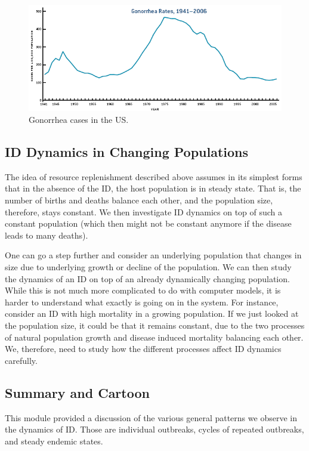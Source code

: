 \documentclass[]{article}
\theoremstyle{definition}
\theoremstyle{definition}
\theoremstyle{definition}
\theoremstyle{remark}
\begin{document}
\begin{figure}
\centering
\includegraphics{./images/gonorrhea.gif}
\caption{\label{fig:gonorrheapattern}Gonorrhea cases in the US.}
\end{figure}

\subsection{ID Dynamics in Changing
Populations}\label{id-dynamics-in-changing-populations}

The idea of resource replenishment described above assumes in its
simplest forms that in the absence of the ID, the host population is in
steady state. That is, the number of births and deaths balance each
other, and the population size, therefore, stays constant. We then
investigate ID dynamics on top of such a constant population (which then
might not be constant anymore if the disease leads to many deaths).

One can go a step further and consider an underlying population that
changes in size due to underlying growth or decline of the population.
We can then study the dynamics of an ID on top of an already dynamically
changing population. While this is not much more complicated to do with
computer models, it is harder to understand what exactly is going on in
the system. For instance, consider an ID with high mortality in a
growing population. If we just looked at the population size, it could
be that it remains constant, due to the two processes of natural
population growth and disease induced mortality balancing each other.
We, therefore, need to study how the different processes affect ID
dynamics carefully.

\subsection{Summary and Cartoon}\label{summary-and-cartoon-2}

This module provided a discussion of the various general patterns we
observe in the dynamics of ID. Those are individual outbreaks, cycles of
repeated outbreaks, and steady endemic states.
\end{document}
